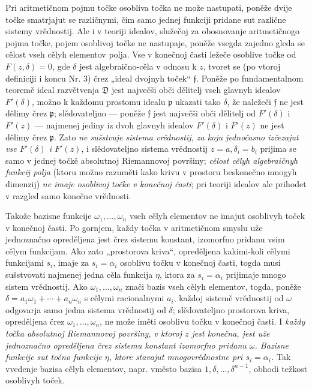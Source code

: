 \documentclass[11pt]{article}
\providecommand{\frD}{\mathfrak D}
\providecommand{\frf}{\mathfrak f}
\providecommand{\frp}{\mathfrak p}
\begin{document}
Pri aritmetičnom pojmu točke osobliva točka ne može nastupati, poněže dvije točke smatrjajut se različnymi, čim samo jednej funkciji pridane sut različne sistemy vrědnostij. Ale i v teoriji idealov, služečoj za obosnovanje aritmetičnogo pojma točke, pojem osoblivoj točke ne nastupaje, poněže vsegda zajedno gleda se cělost vseh cělyh elementov polja. Vse v konečnoj časti ležeče osoblive točke od \(F(z,\delta)=0\), gde \(\delta\) jest algebraično-cěla v odnosu k \(z\), tvoret se (po vtoroj definiciji i koncu Nr. 3) črez „ideal dvojnyh toček“ \(\frf\). Poněže po fundamentalnom teoremě ideal razvětvenja \(\frD\) jest največši obči dělitelj vseh glavnyh idealov \(F'(\delta)\), možno k každomu prostomu idealu \(\frp\) ukazati tako \(\delta\), že naležeči \(\frf\) ne jest dělimy črez \(\frp\); slědovateljno --- poněže \(\frf\) jest največši obči dělitelj od \(F'(\delta)\) i \(F'(z)\) --- najmenej jediny iz dvoh glavnyh idealov \(F'(\delta)\) i \(F'(z)\) ne jest dělimy črez \(\frp\). Zato {\itshape ne sušstvuje sistema vrědnostij, za koju jednočasno izčezajut vse \(F'(\delta)\) i \(F'(z)\)}, i slědovateljno sistema vrědnostij \(z=a,\delta_i=b_i\) prijima se samo v jednej točkě absolutnoj Riemannovoj površiny; {\itshape cělost cělyh algebraičnyh funkcij polja} (ktoru možno razuměti kako krivu v prostoru beskonečno mnogyh dimenzij) {\itshape ne imaje osoblivoj točke v konečnoj časti}; pri teoriji idealov ale prihodet v razgled samo konečne vrědnosti.

Takože bazisne funkcije \(\omega_1,\ldots,\omega_n\) vseh cělyh elementov ne imajut osoblivyh toček v konečnoj časti. Po gornjem, každy točka v aritmetičnom smyslu uže jednoznačno opreděljena jest črez sistemu konstant, izomorfno pridanu vsim cělym funkcijam. Ako zato „prostorova kriva“, opreděljena kakimi-koli cělymi funkcijami \(s_i\), imaje za \(s_i=\alpha_i\) osoblivu točku v konečnoj časti, togda musi sušstvovati najmenej jedna cěla funkcija \(\eta\), ktora za \(s_i=\alpha_i\) prijimaje mnogo sistem vrědnostij. Ako \(\omega_1,\ldots,\omega_n\) znači bazis vseh cělyh elementov, togda, poněže \(\delta=a_1\omega_1+\cdots+a_n\omega_n\) s cělymi racionalnymi \(a_i\), každoj sistemě vrědnostij od \(\omega\) odgovarja samo jedna sistema vrědnostij od \(\delta\); slědovateljno prostorova kriva, opreděljena črez \(\omega_1,\ldots,\omega_n\), ne može iměti osoblivu točku v konečnoj časti. I {\itshape každy točka absolutnoj Riemannovoj površiny, v ktoroj \(z\) jest konečna, jest uže jednoznačno opreděljena črez sistemu konstant izomorfno pridanu \(\omega\). Bazisne funkcije sut točno funkcije \(\eta\), ktore stavajut mnogovrědnostne pri \(s_i=\alpha_i\).} Tak vvedenje bazisa cělyh elementov, napr. vměsto bazisa \(1,\delta,\ldots,\delta^{n-1}\), obhodi težkost osoblivyh toček.
\end{document}
